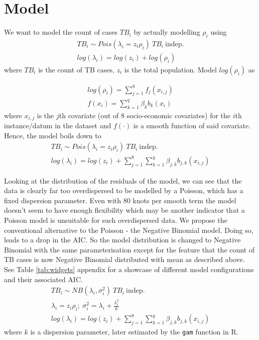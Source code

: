 \section{Model}
We want to model the count of cases $TB_i$ by actually modelling $\rho_i$ using
$$
\begin{aligned}
	TB_i \sim Pois(\lambda_i = z_i \rho_i) \ TB_i\  \mathrm{indep.} 
	\\
	log(\lambda_i) = log(z_i) + log(\rho_i)
\end{aligned}
$$
where $TB_i$ is the count of TB cases, $z_i$ is the total population. Model $log(\rho_i)$ as

$$
\begin{aligned}
	log(\rho_i) = \sum_{j=1}^{8}f_{j}(x_{i,j})
	\\
	f(x_i) = \sum_{k=1}^{q}\beta_{k}b_{k}(x_i)
\end{aligned}
$$
where $x_{i,j}$ is the $j$th covariate (out of 8 socio-economic covariates) for the $i$th instance/datum in the dataset and $f(\cdot)$ is a smooth function of said covariate. Hence, the model boils down to
$$
\begin{aligned}
	TB_i \sim Pois(\lambda_i = z_i \rho_i) \ TB_i\  \mathrm{indep.} 
	\\
	log(\lambda_i) = log(z_i) +  \sum_{j=1}^{8}\sum_{k=1}^{q}\beta_{j,k}b_{j,k}(x_{i,j})
\end{aligned}
$$

Looking at the distribution of the residuals of the model, we can see that the data is clearly far too overdispersed to be modelled by a Poisson, which has a fixed dispersion parameter. Even with 80 knots per smooth term the model doesn't seem to have enough flexibility which may be another indicator that a Poisson model is unsuitable for such overdispersed data. We propose the conventional alternative to the Poisson - the Negative Binomial model. Doing so, leads to a drop in the AIC. So the model distribution is changed to Negative Binomial with the same parameterisation except for
the feature that the count of TB cases is now Negative Binomial distributed with mean as described above.
See Table \ref{tab:widgets} appendix for a showcase of different model configurations and their associated AIC.
$$
\begin{aligned}
	TB_i \sim NB(\lambda_i , \sigma_i^2) \ TB_i\  \mathrm{indep.} 
	\\
	\lambda_i = z_i \rho_i ;\ \sigma_i^2 = \lambda_i +\frac{\lambda_i^2}{k}
	\\
	log(\lambda_i) = log(z_i) +  \sum_{j=1}^{8}\sum_{k=1}^{q}\beta_{j,k}b_{j,k}(x_{i,j})
\end{aligned}
$$
where $k$ is a dispersion parameter, later estimated by  the  \texttt{gam} function in R.
\newline

